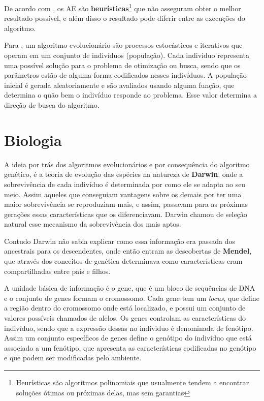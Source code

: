 De acordo com \citeauthor{Linden2008}, os AE são \textbf{heurísticas}\footnote{Heurísticas são algoritmos polinomiais que usualmente tendem a encontrar soluções ótimas ou próximas delas, mas sem garantias} que não asseguram obter o melhor resultado possível, e além disso o resultado pode diferir entre as execuções do algoritmo.

Para \citeauthor{Sivanandam2007}, um algoritmo evolucionário são processos estocásticos e iterativos que operam em um conjunto de indivíduos (população). Cada individuo representa uma possível solução para o problema de otimização ou busca, sendo que os parâmetros estão de alguma forma codificados nesses indivíduos. A população inicial é gerada aleatoriamente e são avaliados usando alguma função, que determina o quão bem o indivíduo responde ao problema. Esse valor determina a direção de busca do algoritmo. 

\section{Biologia}
A ideia por trás dos algoritmos evolucionários e por consequência do algoritmo genético, é a teoria de evolução das espécies na natureza de \textbf{Darwin}, onde a sobrevivência de cada indivíduo é determinada por como ele se adapta ao seu meio. Assim aqueles que conseguiam vantagens sobre os demais por ter uma maior sobrevivência se reproduziam mais, e assim, passavam para as próximas gerações essas características que os diferenciavam. Darwin chamou de seleção natural esse mecanismo da sobrevivência dos mais aptos.

Contudo Darwin não sabia explicar como essa informação era passada dos ancestrais para os descendentes, onde então entram as descobertas de \textbf{Mendel}, que através dos conceitos de genética determinava como características eram compartilhadas entre pais e filhos. 

A unidade básica de informação é o gene, que é um bloco de sequências de DNA e o conjunto de genes formam o cromossomo. Cada gene tem um \textit{locus}, que define a região dentro do cromossomo onde está localizado, e possui um conjunto de valores possíveis chamados de alelos. Os genes controlam as características do indivíduo, sendo que a expressão dessas no individuo é denominada de fenótipo. Assim um conjunto específicos de genes define o genótipo do indivíduo que está associado a um fenótipo, que apresenta as características codificadas no genótipo e que podem ser modificadas pelo ambiente. 

